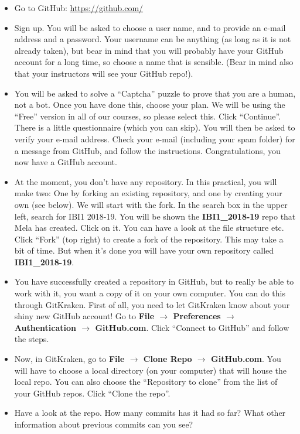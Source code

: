 \documentclass[pdflatex,a4paper]{article}
\begin{document}
\begin{itemize}
\item
Go to GitHub: \url{https://github.com/}
\item
Sign up. You will be asked to choose a user name, and to provide an e-mail address and a password. Your username can be anything (as long as it is not already taken), but bear in mind that you will probably have your GitHub account for a long time, so choose a name that is sensible. (Bear in mind also that your instructors will see your GitHub repo!).
\item
You will be asked to solve a ``Captcha'' puzzle to prove that you are a human, not a bot. Once you have done this, choose your plan. We will be using the ``Free'' version in all of our courses, so please select this. Click ``Continue''. There is a little questionnaire (which you can skip). You will then be asked to verify your e-mail address. Check your e-mail (including your spam folder) for a message from GitHub, and follow the instructions. Congratulations, you now have a GitHub account.
\item
At the moment, you don't have any repository. In this practical, you will make two: One by forking an existing repository, and one by creating your own (see below). We will start with the fork. In the search box in the upper left, search for IBI1 2018-19. You will be shown the  \textbf{IBI1\_2018-19} repo that Mela has created. Click on it. You can have a look at the file structure etc. Click ``Fork'' (top right) to create a fork of the repository. This may take a bit of time. But when it's done you will have your own repository called \textbf{IBI1\_2018-19}. 
\item
You have successfully created a repository in GitHub, but to really be able to work with it, you want a copy of it on your own computer. You can do this through GitKraken. First of all, you need to let GitKraken know about your shiny new GitHub account! Go to \textbf{File \(\rightarrow\) Preferences \(\rightarrow\) Authentication \(\rightarrow\) GitHub.com}. Click ``Connect to GitHub'' and follow the steps.
\item
Now, in GitKraken, go to \textbf{File \(\rightarrow\) Clone Repo \(\rightarrow\) GitHub.com}. You will have to choose a local directory (on your computer) that will house the local repo. You can also choose the ``Repository to clone'' from the list of your GitHub repos. Click ``Clone the repo''.
\item
Have a look at the repo. How many commits has it had so far? What other information about previous commits can you see?

\end{itemize}
\end{document}
